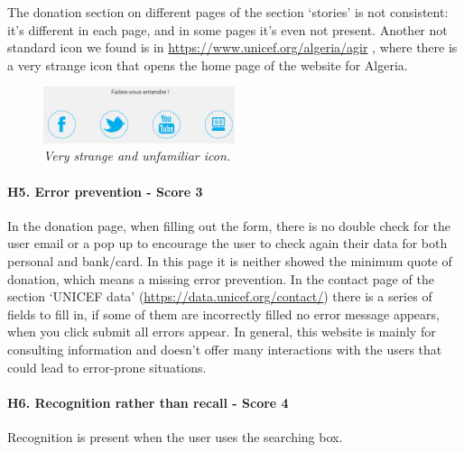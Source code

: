 \newline The donation section on different pages of the section ‘stories’ is not consistent: it’s different in each page, and in some pages it’s even not present.
\newline Another not standard icon we found is in \href{https://www.unicef.org/algeria/agir}{https://www.unicef.org/algeria/agir} , where there is a very strange icon that opens the home page of the website for Algeria.
\begin{figure}[!h]
	\begin{center}
		\includegraphics[width=0.5\textwidth]{FinalScores11.jpg}
		\captionsetup{font=small}
		\caption{\textit{Very strange and unfamiliar icon.}}
	\end{center}
\end{figure}
\newline
\newline \paragraph{H5. Error prevention - Score 3}  \label{subsec:H5}	In the donation page, when filling out the form, there is no double check for the user email or a pop up to encourage the user to check again their data for both personal and bank/card.
In this page it is neither showed the minimum quote of donation, which means a missing error prevention.
\newline In the contact page of the section ‘UNICEF data’ (\href {https://data.unicef.org/contact/}{https://data.unicef.org/contact/}) there is a series of fields to fill in, if some of them are incorrectly filled no error message appears, when you click submit all errors appear.
\newline In general, this website is mainly for consulting information and doesn’t offer many interactions with the users that could lead to error-prone situations.
\newline
\newline \paragraph{H6. Recognition rather than recall - Score 4}  \label{subsec:H6}	Recognition is present when the user uses the searching box.
